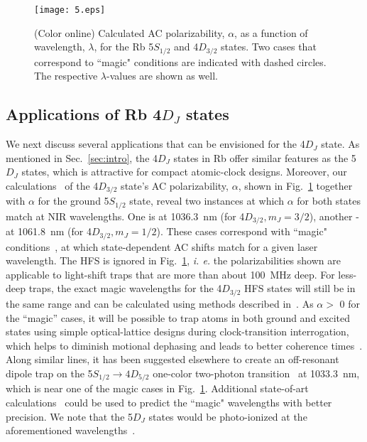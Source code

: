 \documentclass[reprint, amsmath,amssymb, aps, pra, longbibliography]{revtex4-1}
\begin{document}
\begin{figure}[t!]
 \centering
  \texttt{[image: 5.eps]}
  \caption{(Color online) Calculated AC polarizability, $\alpha$, as a function of wavelength, $\lambda$, for the Rb 5$S_{1/2}$ and 4$D_{3/2}$ states. Two cases that correspond to ``magic" conditions are indicated with dashed circles. The respective $\lambda$-values are shown as well.} 
  \label{fig5}
\end{figure}

\subsection{Applications of Rb 4$D_J$  states}
\label{subsec:discuss}

We next discuss several applications that can be envisioned for the 4$D_{J}$ state. As mentioned in Sec.~\ref{sec:intro}, the 4$D_J$ states in Rb offer similar features as the 5$D_J$ states, which is attractive for compact atomic-clock designs. Moreover, our calculations~\cite{cardman2021, atoms10040117} of the 4$D_{3/2}$ state's AC polarizability, $\alpha$, shown in Fig.~\ref{fig5} together with $\alpha$ for the ground 5$S_{1/2}$ state, reveal two instances at which $\alpha$ for both states match at NIR wavelengths. One is at 1036.3~nm (for 4$D_{3/2}, m_J = 3/2$), another - at 1061.8~nm (for 4$D_{3/2}, m_J = 1/2$). These cases correspond with ``magic" conditions~\cite{SafronovaRbMagic, Lundblad2010, zhangpra2011, sahoo2013}, at which state-dependent AC shifts match for a given laser wavelength. The HFS is ignored in Fig.~\ref{fig5}, {\sl{i. e.}} the polarizabilities shown are applicable to light-shift traps that are more than about 100~MHz deep. For less-deep traps, the exact magic wavelengths for the  4$D_{3/2}$ HFS states will still be in the same range and can be calculated using methods described in~\cite{Chen2015}. As $\alpha >$ 0 for the ``magic'' cases, it will be possible to trap atoms in both ground and excited states using simple optical-lattice designs during clock-transition interrogation, which helps to diminish motional dephasing and leads to better coherence times~\cite{atomicclocksreview}. Along similar lines, it has been suggested elsewhere to create an off-resonant dipole trap on the 5$S_{1/2} \rightarrow 4D_{5/2}$ one-color two-photon transition~\cite{Roy17} at 1033.3~nm, which is near one of the magic cases in Fig.~\ref{fig5}. Additional state-of-art calculations~\cite{safronova2004, safronova2011} could be used to predict the ``magic" wavelengths with better precision. 
We note that the 5$D_J$ states would be photo-ionized at the aforementioned wavelengths~\cite{duncan2001prameasurement, cardman2021, atoms10040117}. 
\end{document}
